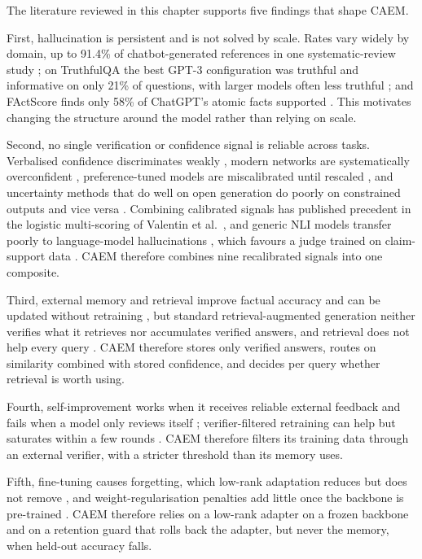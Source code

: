 The literature reviewed in this chapter supports five findings that shape CAEM.

First, hallucination is persistent and is not solved by scale. Rates vary widely by domain, up to 91.4\% of chatbot-generated references in one systematic-review study \cite{info:doi/10.2196/53164}; on TruthfulQA the best GPT-3 configuration was truthful and informative on only 21\% of questions, with larger models often less truthful \cite{lin-etal-2022-truthfulqa}; and FActScore finds only 58\% of ChatGPT's atomic facts supported \cite{min-etal-2023-factscore}. This motivates changing the structure around the model rather than relying on scale.

Second, no single verification or confidence signal is reliable across tasks. Verbalised confidence discriminates weakly \cite{xiong2023can}, modern networks are systematically overconfident \cite{pmlr-v70-guo17a}, preference-tuned models are miscalibrated until rescaled \cite{kadavath2022language, tian2023just}, and uncertainty methods that do well on open generation do poorly on constrained outputs and vice versa \cite{vashurin2024polygraph}. Combining calibrated signals has published precedent in the logistic multi-scoring of Valentin et al.~\cite{valentin2024hallucination}, and generic NLI models transfer poorly to language-model hallucinations \cite{sinha2025semantic}, which favours a judge trained on claim-support data \cite{tang2024minicheck}. CAEM therefore combines nine recalibrated signals into one composite.

Third, external memory and retrieval improve factual accuracy and can be updated without retraining \cite{graves2016differentiable, NEURIPS2020_6b493230}, but standard retrieval-augmented generation neither verifies what it retrieves nor accumulates verified answers, and retrieval does not help every query \cite{mallen2023whennot, wang2023skr}. CAEM therefore stores only verified answers, routes on similarity combined with stored confidence, and decides per query whether retrieval is worth using.

Fourth, self-improvement works when it receives reliable external feedback and fails when a model only reviews itself \cite{NEURIPS2022_639a9a17, huang2024cannot, kamoi-etal-2024-llms}; verifier-filtered retraining can help but saturates within a few rounds \cite{song2024gap, fu2025collapse}. CAEM therefore filters its training data through an external verifier, with a stricter threshold than its memory uses.

Fifth, fine-tuning causes forgetting, which low-rank adaptation reduces but does not remove \cite{hu2022lora, biderman2024lora}, and weight-regularisation penalties add little once the backbone is pre-trained \cite{mehta2023empirical, wu2022pretrained}. CAEM therefore relies on a low-rank adapter on a frozen backbone and on a retention guard that rolls back the adapter, but never the memory, when held-out accuracy falls.

